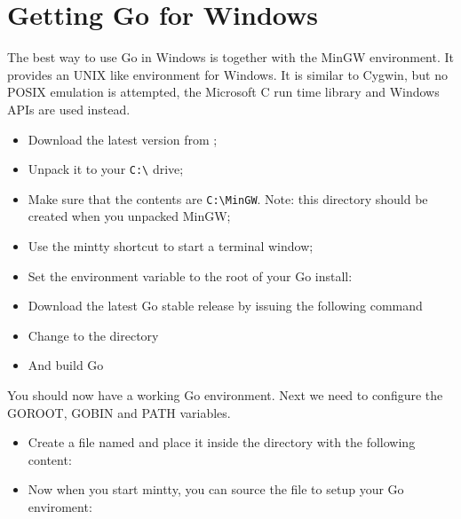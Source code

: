 \section{Getting Go for Windows}
The best way to use Go in Windows is together with the MinGW \cite{go_windows}  environment. 
It provides an UNIX like environment for Windows. It is similar to Cygwin, but no POSIX
emulation is attempted, the Microsoft C run time library and Windows APIs are used instead.
\begin{itemize}
\item Download the latest version from \cite{go_windows};
\item Unpack it to your \verb|C:\| drive;
\item Make sure that the contents are \verb|C:\MinGW|. Note: this directory should be
created when you unpacked MinGW;
\item Use the mintty shortcut to start a terminal window;
\item Set the environment variable  to the root of your
Go install:
\begin{display}
\pr {}
\end{display}
\item Download the latest Go stable release by issuing the following command
\begin{display}
\pr {}
\end{display}
\item Change to the  directory
\begin{display}
\pr {}
\end{display}
\item And build Go
\begin{display}
\pr {}
\end{display}
\end{itemize}
You should now have a working Go environment. Next we need to configure
the GOROOT, GOBIN and PATH variables.

\begin{itemize}
\item Create a file named  and place it inside the  directory
with the following content:
\item Now when you start mintty, you can source the file to setup your Go enviroment:
\begin{display}
\pr {}
\end{display}
\end{itemize}

